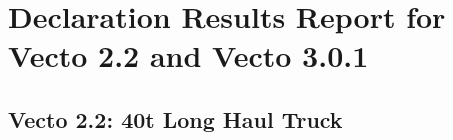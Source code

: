 






\section{Declaration Results Report for Vecto 2.2 and Vecto 3.0.1} %
\label{sec:declaration_results_report_for_vecto_2_2_and_vecto_3_0_1}

\subsection{Vecto 2.2: 40t Long Haul Truck} %
\label{sub:vecto_2_2_40t_long_haul_truck}

% 

